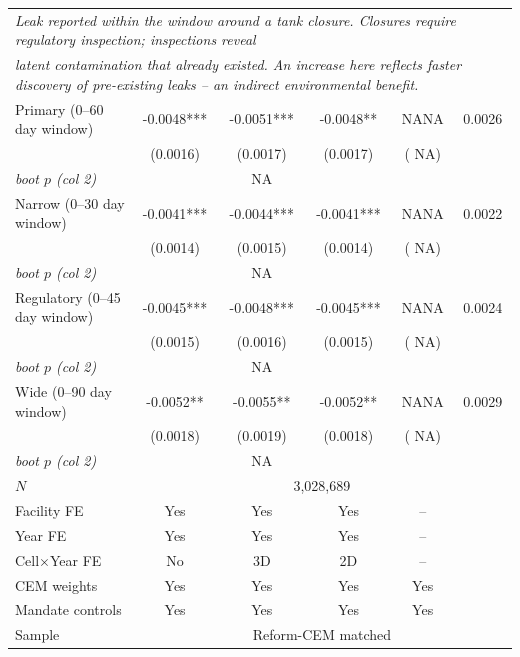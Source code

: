 \begin{table}[htbp]
\begin{tabular}{lccccc}
\multicolumn{6}{l}{\small\textit{Leak reported within the window around a tank closure. Closures require regulatory inspection; inspections reveal }} \\
\multicolumn{6}{l}{\small\textit{latent contamination that already existed. An increase here reflects faster discovery of pre-existing leaks -- an indirect environmental benefit.}} \\[0.3em]
Primary (0--60 day window) & -0.0048*** & -0.0051*** & -0.0048** &    NANA & 0.0026 \\
 & (0.0016) & (0.0017) & (0.0017) & (   NA) &  \\
 \hspace{0.5em}\textit{boot $p$ (col 2)} & &   NA & \multicolumn{2}{c}{} &  \\[0.2em]
Narrow (0--30 day window) & -0.0041*** & -0.0044*** & -0.0041*** &    NANA & 0.0022 \\
 & (0.0014) & (0.0015) & (0.0014) & (   NA) &  \\
 \hspace{0.5em}\textit{boot $p$ (col 2)} & &   NA & \multicolumn{2}{c}{} &  \\[0.2em]
Regulatory (0--45 day window) & -0.0045*** & -0.0048*** & -0.0045*** &    NANA & 0.0024 \\
 & (0.0015) & (0.0016) & (0.0015) & (   NA) &  \\
 \hspace{0.5em}\textit{boot $p$ (col 2)} & &   NA & \multicolumn{2}{c}{} &  \\[0.2em]
Wide (0--90 day window) & -0.0052** & -0.0055** & -0.0052** &    NANA & 0.0029 \\
 & (0.0018) & (0.0019) & (0.0018) & (   NA) &  \\
 \hspace{0.5em}\textit{boot $p$ (col 2)} & &   NA & \multicolumn{2}{c}{} &  \\[0.2em]
\midrule
$N$ & \multicolumn{5}{c}{3,028,689} \\
Facility FE            & Yes & Yes & Yes & -- & \\
Year FE                & Yes & Yes & Yes & -- & \\
Cell$\times$Year FE   & No  & 3D  & 2D  & -- & \\
CEM weights            & Yes & Yes & Yes & Yes & \\
Mandate controls       & Yes & Yes & Yes & Yes & \\
Sample & \multicolumn{5}{c}{Reform-CEM matched} \\
\bottomrule

\end{tabular}
\end{table}

